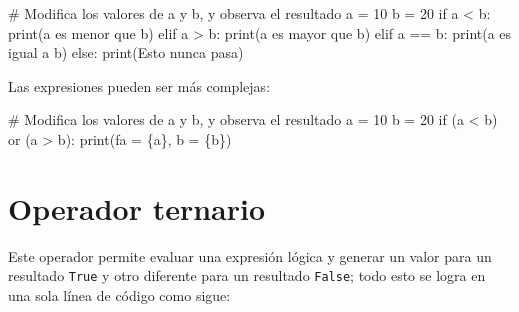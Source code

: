 \documentclass[
  letterpaper,
  DIV=11,
  numbers=noendperiod]{scrreprt}
\newenvironment{Shaded}{\begin{snugshade}}{\end{snugshade}}
\newcommand{\BuiltInTok}[1]{\textcolor[rgb]{0.00,0.23,0.31}{#1}}
\newcommand{\CommentTok}[1]{\textcolor[rgb]{0.37,0.37,0.37}{#1}}
\newcommand{\ControlFlowTok}[1]{\textcolor[rgb]{0.00,0.23,0.31}{#1}}
\newcommand{\DecValTok}[1]{\textcolor[rgb]{0.68,0.00,0.00}{#1}}
\newcommand{\KeywordTok}[1]{\textcolor[rgb]{0.00,0.23,0.31}{#1}}
\newcommand{\NormalTok}[1]{\textcolor[rgb]{0.00,0.23,0.31}{#1}}
\newcommand{\OperatorTok}[1]{\textcolor[rgb]{0.37,0.37,0.37}{#1}}
\newcommand{\SpecialCharTok}[1]{\textcolor[rgb]{0.37,0.37,0.37}{#1}}
\newcommand{\SpecialStringTok}[1]{\textcolor[rgb]{0.13,0.47,0.30}{#1}}
\newcommand{\StringTok}[1]{\textcolor[rgb]{0.13,0.47,0.30}{#1}}
\begin{document}
\begin{Shaded}
\begin{Highlighting}[]
\CommentTok{\# Modifica los valores de a y b, y observa el resultado}
\NormalTok{a }\OperatorTok{=} \DecValTok{10}
\NormalTok{b }\OperatorTok{=} \DecValTok{20}
\ControlFlowTok{if}\NormalTok{ a }\OperatorTok{\textless{}}\NormalTok{ b:}
    \BuiltInTok{print}\NormalTok{(}\StringTok{\textquotesingle{}a es menor que b\textquotesingle{}}\NormalTok{)}
\ControlFlowTok{elif}\NormalTok{ a }\OperatorTok{\textgreater{}}\NormalTok{ b:}
    \BuiltInTok{print}\NormalTok{(}\StringTok{\textquotesingle{}a es mayor que b\textquotesingle{}}\NormalTok{)}
\ControlFlowTok{elif}\NormalTok{ a }\OperatorTok{==}\NormalTok{ b:}
    \BuiltInTok{print}\NormalTok{(}\StringTok{\textquotesingle{}a es igual a b\textquotesingle{}}\NormalTok{)}
\ControlFlowTok{else}\NormalTok{:}
    \BuiltInTok{print}\NormalTok{(}\StringTok{\textquotesingle{}Esto nunca pasa\textquotesingle{}}\NormalTok{)}
\end{Highlighting}
\end{Shaded}

Las expresiones pueden ser más complejas:

\begin{Shaded}
\begin{Highlighting}[]
\CommentTok{\# Modifica los valores de a y b, y observa el resultado}
\NormalTok{a }\OperatorTok{=} \DecValTok{10}
\NormalTok{b }\OperatorTok{=} \DecValTok{20}
\ControlFlowTok{if}\NormalTok{ (a }\OperatorTok{\textless{}}\NormalTok{ b) }\KeywordTok{or}\NormalTok{ (a }\OperatorTok{\textgreater{}}\NormalTok{ b):}
    \BuiltInTok{print}\NormalTok{(}\SpecialStringTok{f\textquotesingle{}a = }\SpecialCharTok{\{}\NormalTok{a}\SpecialCharTok{\}}\SpecialStringTok{, b = }\SpecialCharTok{\{}\NormalTok{b}\SpecialCharTok{\}}\SpecialStringTok{\textquotesingle{}}\NormalTok{)}
\end{Highlighting}
\end{Shaded}


\chapter{Operador ternario}\label{operador-ternario}

Este operador permite evaluar una expresión lógica y generar un valor
para un resultado \texttt{True} y otro diferente para un resultado
\texttt{False}; todo esto se logra en una sola línea de código como
sigue:
\end{document}
